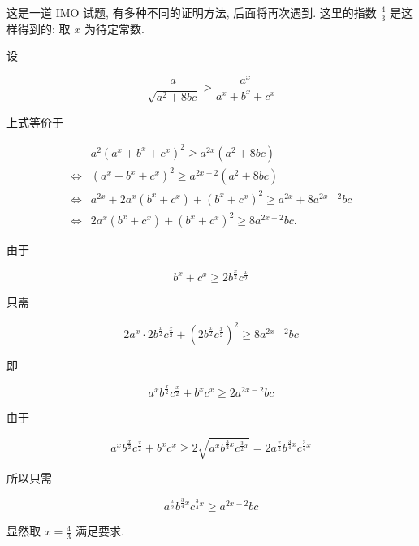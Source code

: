 \begin{note}
	这是一道 IMO 试题, 有多种不同的证明方法, 后面将再次遇到. 这里的指数 $\frac{4}{3}$ 是这样得到的: 取 $x$ 为待定常数.
	
	设
	
	$$
	\frac{a}{\sqrt{a^{2}+8 b c}} \geqslant \frac{a^{x}}{a^{x}+b^{x}+c^{x}}
	$$
	
	上式等价于
	
	$$
	\begin{aligned}
	& a^{2}\left(a^{x}+b^{x}+c^{x}\right)^{2} \geqslant a^{2 x}\left(a^{2}+8 b c\right) \\
	\Leftrightarrow & \left(a^{x}+b^{x}+c^{x}\right)^{2} \geqslant a^{2 x-2}\left(a^{2}+8 b c\right) \\
	\Leftrightarrow & a^{2 x}+2 a^{x}\left(b^{x}+c^{x}\right)+\left(b^{x}+c^{x}\right)^{2} \geqslant a^{2 x}+8 a^{2 x-2} b c \\
	\Leftrightarrow & 2 a^{x}\left(b^{x}+c^{x}\right)+\left(b^{x}+c^{x}\right)^{2} \geqslant 8 a^{2 x-2} b c .
	\end{aligned}
	$$
	
	由于
	
	$$
	b^{x}+c^{x} \geqslant 2 b^{\frac{x}{2}} c^{\frac{x}{2}}
	$$
	
	只需
	
	$$
	2 a^{x} \cdot 2 b^{\frac{x}{2}} c^{\frac{x}{2}}+\left(2 b^{\frac{x}{2}} c^{\frac{x}{2}}\right)^{2} \geqslant 8 a^{2 x-2} b c
	$$
	
	即
	
	$$
	a^{x} b^{\frac{x}{2}} c^{\frac{x}{2}}+b^{x} c^{x} \geqslant 2 a^{2 x-2} b c
	$$
	
	由于
	
	$$
	a^{x} b^{\frac{x}{2}} c^{\frac{x}{2}}+b^{x} c^{x} \geqslant 2 \sqrt{a^{x} b^{\frac{3}{2} x} c^{\frac{3}{2} x}}=2 a^{\frac{x}{2}} b^{\frac{3}{4} x} c^{\frac{3}{4} x}
	$$
	
	所以只需
	
	$$
	a^{\frac{x}{2}} b^{\frac{3}{4} x} c^{\frac{3}{4} x} \geqslant a^{2 x-2} b c
	$$
	
	显然取 $x=\frac{4}{3}$ 满足要求.
\end{note}

